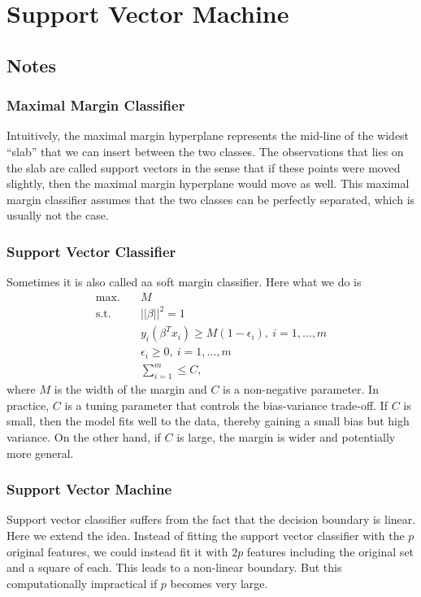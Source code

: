 \section{Support Vector Machine}
\subsection{Notes}
\subsubsection{Maximal Margin Classifier}
Intuitively, the maximal margin hyperplane represents the mid-line of the widest ``slab'' that we can insert between the two classes. The observations that lies on the slab are called support vectors in the sense that if these points were moved slightly, then the maximal margin hyperplane would move as well. This maximal margin classifier assumes that the two classes can be perfectly separated, which is usually not the case.
\subsubsection{Support Vector Classifier}
Sometimes it is also called aa soft margin classifier. Here what we do is 
\begin{align*}
\text{max.} \quad & M\\
\text{s.t.} \quad & ||\beta||^2 =1 \\
				  & y_i(\beta^Tx_i) \geq M(1-\epsilon_i),\ i =1,\dots,m \\
				  & \epsilon_i \geq 0,\ i=1,\dots,m \\
				  & \sum_{i=1}^m \leq C,
\end{align*}
where $M$ is the width of the margin and $C$ is a non-negative parameter. In practice, $C$ is a tuning parameter that controls the bias-variance trade-off. If $C$ is small, then the model fits well to the data, thereby gaining a small bias but high variance. On the other hand, if $C$ is large, the margin is wider and potentially more general.
\subsubsection{Support Vector Machine}
Support vector classifier suffers from the fact that the decision boundary is linear. Here we extend the idea. Instead of fitting the support vector classifier with the $p$ original features, we could instead fit it with $2p$ features including the original set and a square of each. This leads to a non-linear boundary. But this computationally impractical if $p$ becomes very large.

